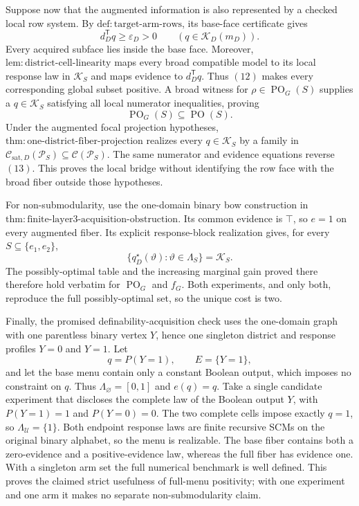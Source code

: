 Suppose now that the augmented information is also represented by a checked local
row system.  By \(\mathrm{def:target\text{-}arm\text{-}rows}\), its base-face
certificate gives
\[
d_D^{\mathsf T}q\geq\varepsilon_D>0
\qquad(q\in\mathcal K_D(m_D)).
\tag{12}
\]
Every acquired subface lies inside the base face.  Moreover,
\(\mathrm{lem:district\text{-}cell\text{-}linearity}\) maps every broad compatible
model to its local response law in \(\mathcal K_S\) and maps evidence to
\(d_D^{\mathsf T}q\).  Thus \((12)\) makes every corresponding global subset
positive.  A broad witness for \(\rho\in\operatorname{PO}_G(S)\) supplies a
\(q\in\mathcal K_S\) satisfying all local numerator inequalities, proving
\[
\operatorname{PO}_G(S)\subseteq\operatorname{PO}(S).
\tag{13}
\]
Under the augmented focal projection hypotheses,
\(\mathrm{thm:one\text{-}district\text{-}fiber\text{-}projection}\) realizes every
\(q\in\mathcal K_S\) by a family in
\(\mathcal C_{\mathrm{sat},D}(\mathcal P_S)\subseteq\mathcal C(\mathcal P_S)\).
The same numerator and evidence equations reverse \((13)\).  This proves the local
bridge without identifying the row face with the broad fiber outside those
hypotheses.

For non-submodularity, use the one-domain binary bow construction in
\(\mathrm{thm:finite\text{-}layer3\text{-}acquisition\text{-}obstruction}\).  Its
common evidence is \(\top\), so \(e=1\) on every augmented fiber.  Its explicit
response-block realization gives, for every \(S\subseteq\{e_1,e_2\}\),
\[
\{q_D^\star(\vartheta):\vartheta\in\Lambda_S\}=\mathcal K_S.
\tag{14}
\]
The possibly-optimal table and the increasing marginal gain proved there therefore
hold verbatim for \(\operatorname{PO}_G\) and \(f_G\).  Both experiments, and only
both, reproduce the full possibly-optimal set, so the unique cost is two.

Finally, the promised definability-acquisition check uses the one-domain graph with
one parentless binary vertex \(Y\), hence one singleton district and response
profiles \(Y=0\) and \(Y=1\).  Let
\[
q=P(Y=1),\qquad E=\{Y=1\},
\tag{15}
\]
and let the base menu contain only a constant Boolean output, which imposes no
constraint on \(q\).  Thus \(\Lambda_{\varnothing}=[0,1]\) and \(e(q)=q\).  Take a
single candidate experiment that discloses the complete law of the Boolean output
\(Y\), with \(P(Y=1)=1\) and \(P(Y=0)=0\).  The two complete cells impose exactly
\(q=1\), so \(\Lambda_{\mathcal U}=\{1\}\).  Both endpoint response laws are finite
recursive SCMs on the original binary alphabet, so the menu is realizable.  The
base fiber contains both a zero-evidence and a positive-evidence law, whereas the
full fiber has evidence one.  With a singleton arm set the full numerical benchmark
is well defined.  This proves the claimed strict usefulness of full-menu positivity;
with one experiment and one arm it makes no separate non-submodularity claim.